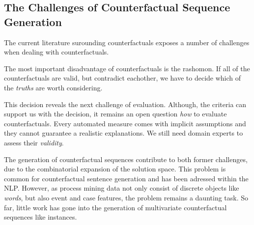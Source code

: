 \documentclass[./../../paper.tex]{subfiles}
\begin{document}
\subsection{The Challenges of Counterfactual Sequence Generation}
The current literature surounding counterfactuals exposes a number of challenges when dealing with counterfactuals.

The most important disadvantage of counterfactuals is the \gls{rashomon}\autocite[ch.9.3]{molnar2019}. If all of the counterfactuals are valid, but contradict eachother, we have to decide which of the \emph{truths} are worth considering.

This decision reveals the next challenge of evaluation\needscite{}. Although, the criteria can support us with the decision, it remains an open question \emph{how} to evaluate counterfactuals. Every automated measure comes with implicit assumptions and they cannot guarantee a realistic explanations. We still need domain experts to assess their \emph{validity}.

The generation of counterfactual sequences contribute to both former challenges, due to the combinatorial expansion of the solution space. This problem is common for counterfactual sentence generation and has been adressed within the \gls{NLP}\needscite{}. However, as process mining data not only consist of discrete objects like \emph{words}, but also event and case features, the problem remains a daunting task. So far, little work has gone into the generation of multivariate counterfactual sequences like \glspl{instance}\needscite{}.


\end{document}
